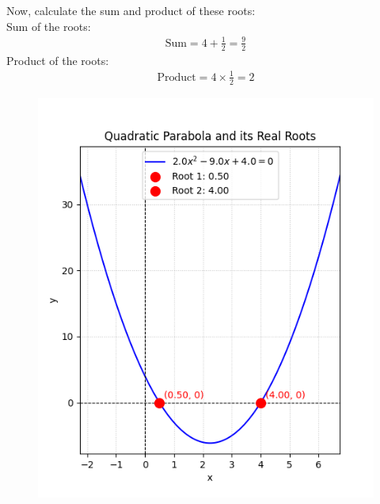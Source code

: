 \documentclass[journal]{IEEEtran}
\begin{document}
Now, calculate the sum and product of these roots:\\
Sum of the roots:
\begin{align}
\text{Sum} = 4 + \frac{1}{2} = \frac{9}{2}
\end{align}
Product of the roots:
\begin{align}
\text{Product} = 4 \times \frac{1}{2} = 2
\end{align}

\begin{figure}[H]
\centering
\includegraphics[width=0.7\columnwidth]{figs/fig1.png}
\caption{}
\label{fig:1}
\end{figure}
\end{document}
